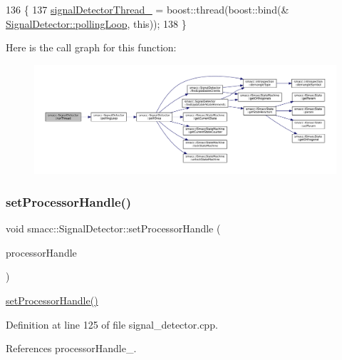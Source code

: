\begin{DoxyCode}
136 \{
137     \hyperlink{classsmacc_1_1SignalDetector_a4346a400cd37eafc5d1d2e63d975785e}{signalDetectorThread\_} = boost::thread(boost::bind(&
      \hyperlink{classsmacc_1_1SignalDetector_a2665e66cdae9f6533c64bbcecf3fa199}{SignalDetector::pollingLoop}, \textcolor{keyword}{this}));
138 \}
\end{DoxyCode}
Here is the call graph for this function\+:
\nopagebreak
\begin{figure}[H]
\begin{center}
\leavevmode
\includegraphics[width=350pt]{classsmacc_1_1SignalDetector_a48b3fee853ddcb25732408b22ecfcf39_cgraph}
\end{center}
\end{figure}
\mbox{\label{classsmacc_1_1SignalDetector_ac1197a77c32a3b817005391e550ce646}} 
\subsubsection{\texorpdfstring{set\+Processor\+Handle()}{setProcessorHandle()}}
{\footnotesize\ttfamily void smacc\+::\+Signal\+Detector\+::set\+Processor\+Handle (\begin{DoxyParamCaption}\item[{Smacc\+Fifo\+Scheduler\+::processor\+\_\+handle}]{processor\+Handle }\end{DoxyParamCaption})}

\hyperlink{classsmacc_1_1SignalDetector_ac1197a77c32a3b817005391e550ce646}{set\+Processor\+Handle()} 

Definition at line 125 of file signal\+\_\+detector.\+cpp.



References processor\+Handle\+\_\+.



